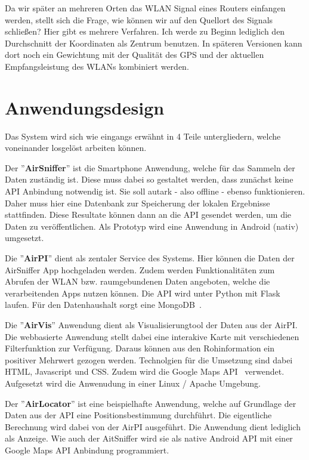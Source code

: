 \documentclass[11pt,a4paper]{article}
\begin{document}
Da wir später an mehreren Orten das WLAN Signal eines Routers einfangen werden, stellt sich die Frage, wie können wir auf den Quellort des Signals schließen? Hier gibt es mehrere Verfahren. Ich werde zu Beginn lediglich den Durchschnitt der Koordinaten als Zentrum benutzen. In späteren Versionen kann dort noch ein Gewichtung mit der Qualität des GPS und der aktuellen Empfangsleistung des WLANs kombiniert werden.

\section{Anwendungsdesign}

Das System wird sich wie eingangs erwähnt in 4 Teile untergliedern, welche voneinander losgelöst arbeiten können.

Der ''\textbf{AirSniffer}'' ist die Smartphone Anwendung, welche für das Sammeln der Daten zuständig ist. Diese muss dabei so gestaltet werden, dass zunächst keine API Anbindung notwendig ist. Sie soll autark - also offline - ebenso funktionieren. Daher muss hier eine Datenbank zur Speicherung der lokalen Ergebnisse stattfinden. Diese Resultate können dann an die API gesendet werden, um die Daten zu veröffentlichen. Als Prototyp wird eine Anwendung in Android (nativ) umgesetzt. 

Die ''\textbf{AirPI}'' dient als zentaler Service des Systems. Hier können die Daten der AirSniffer App hochgeladen werden. Zudem werden Funktionalitäten zum Abrufen der WLAN bzw. raumgebundenen Daten angeboten, welche die verarbeitenden Apps nutzen können. Die API wird unter Python mit Flask~\cite{flask} laufen. Für den Datenhaushalt sorgt eine MongoDB~\cite{mongodb}.

Die ''\textbf{AirVis}'' Anwendung dient als Visualisierungtool der Daten aus der AirPI. Die webbasierte Anwendung stellt dabei eine interakive Karte mit verschiedenen Filterfunktion zur Verfügung. Daraus können aus den Rohinformation ein positiver Mehrwert gezogen werden. Technolgien für die Umsetzung sind dabei HTML, Javascript und CSS. Zudem wird die Google Maps API~\cite{googlemapsapi} verwendet. Aufgesetzt wird die Anwenudung in einer Linux / Apache Umgebung.

Der ''\textbf{AirLocator}'' ist eine beispielhafte Anwendung, welche auf Grundlage der Daten aus der API eine Positionsbestimmung durchführt. Die eigentliche Berechnung wird dabei von der AirPI ausgeführt. Die Anwendung dient lediglich als Anzeige. Wie auch der AitSniffer wird sie als native Android API mit einer Google Maps API Anbindung programmiert.
\end{document}
